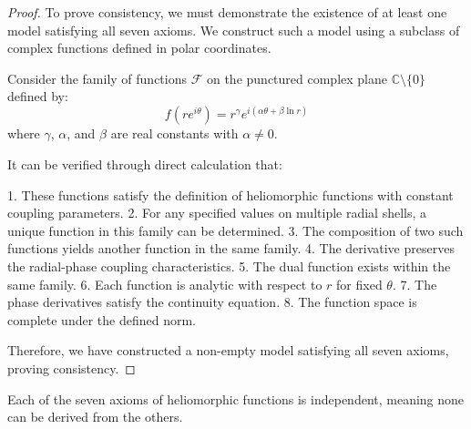 \begin{proof}
To prove consistency, we must demonstrate the existence of at least one model satisfying all seven axioms. We construct such a model using a subclass of complex functions defined in polar coordinates.

Consider the family of functions $\mathcal{F}$ on the punctured complex plane $\mathbb{C} \setminus \{0\}$ defined by:
\begin{equation}
f(re^{i\theta}) = r^{\gamma}e^{i(\alpha\theta + \beta\ln r)}
\end{equation}
where $\gamma$, $\alpha$, and $\beta$ are real constants with $\alpha \neq 0$.

It can be verified through direct calculation that:

1. These functions satisfy the definition of heliomorphic functions with constant coupling parameters.
2. For any specified values on multiple radial shells, a unique function in this family can be determined.
3. The composition of two such functions yields another function in the same family.
4. The derivative preserves the radial-phase coupling characteristics.
5. The dual function exists within the same family.
6. Each function is analytic with respect to $r$ for fixed $\theta$.
7. The phase derivatives satisfy the continuity equation.
8. The function space is complete under the defined norm.

Therefore, we have constructed a non-empty model satisfying all seven axioms, proving consistency.
\end{proof}

\begin{theorem}
Each of the seven axioms of heliomorphic functions is independent, meaning none can be derived from the others.
\end{theorem}

